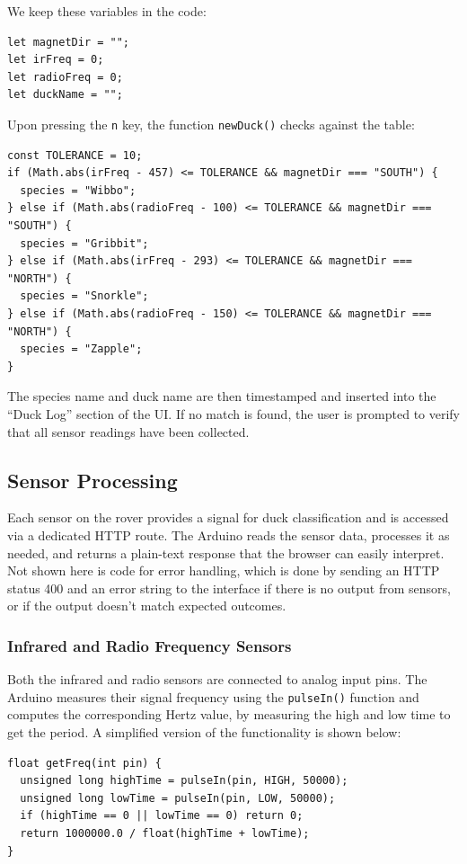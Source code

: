 We keep these variables in the code:
\begin{verbatim}
let magnetDir = "";
let irFreq = 0;
let radioFreq = 0;
let duckName = "";
\end{verbatim}

Upon pressing the \texttt{n} key, the function \texttt{newDuck()} checks against the table:
\begin{verbatim}
const TOLERANCE = 10;
if (Math.abs(irFreq - 457) <= TOLERANCE && magnetDir === "SOUTH") {
  species = "Wibbo";
} else if (Math.abs(radioFreq - 100) <= TOLERANCE && magnetDir === "SOUTH") {
  species = "Gribbit";
} else if (Math.abs(irFreq - 293) <= TOLERANCE && magnetDir === "NORTH") {
  species = "Snorkle";
} else if (Math.abs(radioFreq - 150) <= TOLERANCE && magnetDir === "NORTH") {
  species = "Zapple";
}
\end{verbatim}

The species name and duck name are then timestamped and inserted into the “Duck Log” section of the UI. If no match is found, the user is prompted to verify that all sensor readings have been collected.

\subsection*{Sensor Processing}
Each sensor on the rover provides a signal for duck classification and is accessed via a dedicated HTTP route. The Arduino reads the sensor data, processes it as needed, and returns a plain-text response that the browser can easily interpret. Not shown here is code for error handling, which is done by sending an HTTP status 400 and an error string to the interface if there is no output from sensors, or if the output doesn’t match expected outcomes.

\subsubsection*{Infrared and Radio Frequency Sensors}
Both the infrared and radio sensors are connected to analog input pins. The Arduino measures their signal frequency using the \texttt{pulseIn()} function and computes the corresponding Hertz value, by measuring the high and low time to get the period. A simplified version of the functionality is shown below:

\begin{verbatim}
float getFreq(int pin) {
  unsigned long highTime = pulseIn(pin, HIGH, 50000);
  unsigned long lowTime = pulseIn(pin, LOW, 50000);
  if (highTime == 0 || lowTime == 0) return 0;
  return 1000000.0 / float(highTime + lowTime);
}
\end{verbatim}


